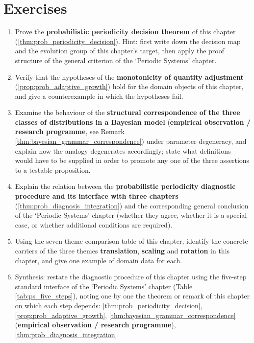 \section*{Exercises}

\begin{enumerate}[leftmargin=3em, label=\textbf{Exercise \arabic*}]
    \item Prove the \textbf{probabilistic periodicity decision theorem} of this chapter (\ref{thm:prob_periodicity_decision}). Hint: first write down the decision map and the evolution group of this chapter's target, then apply the proof structure of the general criterion of the `Periodic Systems' chapter.

    \item Verify that the hypotheses of the \textbf{monotonicity of quantity adjustment} (\ref{prop:prob_adaptive_growth}) hold for the domain objects of this chapter, and give a counterexample in which the hypotheses fail.

    \item Examine the behaviour of the \textbf{structural correspondence of the three classes of distributions in a Bayesian model} (\textbf{empirical observation / research programme}, see Remark \ref{thm:bayesian_grammar_correspondence}) under parameter degeneracy, and explain how the analogy degenerates accordingly; state what definitions would have to be supplied in order to promote any one of the three assertions to a testable proposition.

    \item Explain the relation between the \textbf{probabilistic periodicity diagnostic procedure and its interface with three chapters} (\ref{thm:prob_diagnosis_integration}) and the corresponding general conclusion of the `Periodic Systems' chapter (whether they agree, whether it is a special case, or whether additional conditions are required).

    \item Using the seven-theme comparison table of this chapter, identify the concrete carriers of the three themes \textbf{translation}, \textbf{scaling} and \textbf{rotation} in this chapter, and give one example of domain data for each.

    \item Synthesis: restate the diagnostic procedure of this chapter using the five-step standard interface of the `Periodic Systems' chapter (Table \ref{tab:ps_five_steps}), noting one by one the theorem or remark of this chapter on which each step depends: \ref{thm:prob_periodicity_decision}, \ref{prop:prob_adaptive_growth}, \ref{thm:bayesian_grammar_correspondence} (\textbf{empirical observation / research programme}), \ref{thm:prob_diagnosis_integration}.
\end{enumerate}

